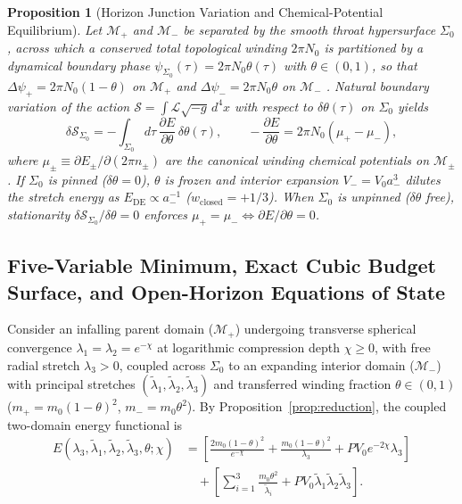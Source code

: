 \documentclass[pdflatex,sn-mathphys-num]{sn-jnl}
\theoremstyle{thmstyleone}
\newtheorem{proposition}[theorem]{Proposition}
\theoremstyle{thmstyletwo}
\theoremstyle{thmstylethree}
\begin{document}
\begin{proposition}[Horizon Junction Variation and Chemical-Potential Equilibrium]\label{prop:junction}
Let $\mathcal{M}_+$ and $\mathcal{M}_-$ be separated by the smooth throat hypersurface $\Sigma_0$, across which a conserved total topological winding $2\pi N_0$ is partitioned by a dynamical boundary phase $\psi_{\Sigma_0}(\tau) = 2\pi N_0 \theta(\tau)$ with $\theta \in (0,1)$, so that $\Delta\psi_+ = 2\pi N_0(1-\theta)$ on $\mathcal{M}_+$ and $\Delta\psi_- = 2\pi N_0\theta$ on $\mathcal{M}_-$ \cite{Israel1966}. Natural boundary variation of the action $\mathcal{S} = \int \mathcal{L}\sqrt{-g}\,d^4x$ with respect to $\delta\theta(\tau)$ on $\Sigma_0$ yields
\begin{equation}\label{eq:junction_variation}
\delta\mathcal{S}_{\Sigma_0} = -\int_{\Sigma_0} d\tau\,\frac{\partial E}{\partial\theta}\,\delta\theta(\tau), \qquad -\frac{\partial E}{\partial\theta} = 2\pi N_0\left(\mu_+ - \mu_-\right),
\end{equation}
where $\mu_\pm \equiv \partial E_\pm / \partial(2\pi n_\pm)$ are the canonical winding chemical potentials on $\mathcal{M}_\pm$. If $\Sigma_0$ is pinned ($\delta\theta = 0$), $\theta$ is frozen and interior expansion $V_- = V_0 a_-^3$ dilutes the stretch energy as $E_{\mathrm{DE}} \propto a_-^{-1}$ ($w_{\mathrm{closed}} = +1/3$). When $\Sigma_0$ is unpinned ($\delta\theta$ free), stationarity $\delta\mathcal{S}_{\Sigma_0}/\delta\theta = 0$ enforces $\mu_+ = \mu_- \iff \partial E/\partial\theta = 0$.
\end{proposition}

\subsection{Five-Variable Minimum, Exact Cubic Budget Surface, and Open-Horizon Equations of State}\label{subsec:theorem1}

Consider an infalling parent domain ($\mathcal{M}_+$) undergoing transverse spherical convergence $\lambda_1 = \lambda_2 = e^{-\chi}$ at logarithmic compression depth $\chi \ge 0$, with free radial stretch $\lambda_3 > 0$, coupled across $\Sigma_0$ to an expanding interior domain ($\mathcal{M}_-$) with principal stretches $(\tilde{\lambda}_1,\tilde{\lambda}_2,\tilde{\lambda}_3)$ and transferred winding fraction $\theta \in (0,1)$ ($m_+ = m_0(1-\theta)^2$, $m_- = m_0\theta^2$). By Proposition~\ref{prop:reduction}, the coupled two-domain energy functional is
\begin{align}
E(\lambda_3,\tilde{\lambda}_1,\tilde{\lambda}_2,\tilde{\lambda}_3,\theta;\chi) &= \left[\frac{2m_0(1-\theta)^2}{e^{-\chi}} + \frac{m_0(1-\theta)^2}{\lambda_3} + PV_0 e^{-2\chi}\lambda_3\right] \nonumber\\
&\quad + \left[\sum_{i=1}^3 \frac{m_0\theta^2}{\tilde{\lambda}_i} + PV_0\tilde{\lambda}_1\tilde{\lambda}_2\tilde{\lambda}_3\right]. \label{eq:five_var_E}
\end{align}
\end{document}

